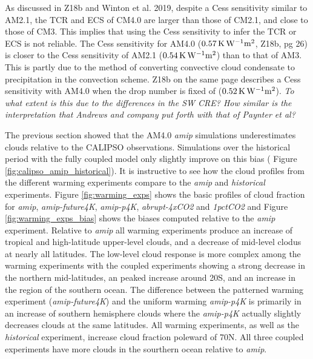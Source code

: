 \documentclass[draft]{agujournal2019}
\begin{document}
As discussed in Z18b and Winton et al. 2019, despite a Cess sensitivity similar to AM2.1, 
the TCR and ECS of CM4.0 are larger than those of CM2.1, and close to those of CM3.   This implies 
that using the Cess sensitivity to infer the TCR or ECS is not reliable.  
The Cess sensitivity for AM4.0 ($0.57 \, \rm{K\, W^{-1} m^2}$, Z18b, pg 26) is closer to the Cess sensitivity 
of AM2.1 ($0.54 \, \rm{K\, W^{-1} m^2}$) than to that of AM3.  This is partly due to the method of converting convective cloud condensate to precipitation in the convection scheme.   
Z18b on the same page describes a Cess sensitivity with AM4.0 when the drop number
is fixed of ($0.52 \, \rm{K\, W^{-1} m^2}$).   
\textit{To what extent is this due to the differences in the SW CRE?  How similar is the interpretation that
Andrews and company put forth with that of Paynter et al?}

The previous section showed that the AM4.0 \textit{amip} simulations underestimates clouds relative to 
the CALIPSO observations.   Simulations over the historical period with the fully coupled model only 
slightly improve on this bias ( Figure \ref{fig:calipso_amip_historical}). 
It is instructive to see how the cloud profiles from the different warming experiments compare to 
the \textit{amip} and \textit{historical} experiments.   Figure \ref{fig:warming_exps} shows the basic 
profiles of cloud fraction for \textit{amip}, \textit{amip-future4K}, \textit{amip-p4K}, \textit{abrupt-4xCO2}
 and \textit{1pctCO2} and Figure \ref{fig:warming_exps_bias} shows the biases computed relative to 
 the \textit{amip} experiment.  Relative to \textit{amip} all warming experiments produce an increase 
 of tropical and high-latitude upper-level clouds, and a decrease of mid-level clodus at nearly all latitudes.  
 The low-level cloud response is more complex among the warming experiments with the coupled 
 experiments showing a strong decrease in the northern mid-latitudes, an peaked increase around 
 20S, and an increase in the region of the southern ocean.   The difference between the patterned warming
 experiment (\textit{amip-future4K}) and the uniform warming \textit{amip-p4K} is primarily in an 
 increase of southern hemisphere clouds where the \textit{amip-p4K} actually slightly decreases
 clouds at the same latitudes.  All warming experiments, as well as the \textit{historical} experiment, 
 increase cloud fraction poleward of 70N.  All three coupled experiments have more clouds in the sourthern 
 ocean relative to \textit{amip}.  
 
\end{document}
